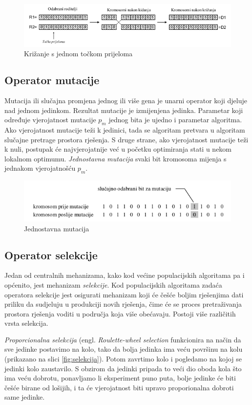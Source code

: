 \documentclass[times, utf8, zavrsni, numeric]{fer}
\begin{document}
\begin{figure}[htb]
\centering
\includegraphics[width=12cm]{img/krizanje.png}
\caption{Križanje s jednom točkom prijeloma}
\label{fig:krizanje}
\end{figure}

\subsection{Operator mutacije}
Mutacija ili slučajna promjena jednog ili više gena je unarni operator koji djeluje nad jednom jedinkom. Rezultat mutacije je izmijenjena jedinka. Parametar koji određuje vjerojatnost mutacije $p_m$ jednog bita je ujedno i parametar algoritma. Ako vjerojatnost mutacije teži k jedinici, tada se algoritam pretvara u algoritam slučajne pretrage prostora rješenja. S druge strane, ako vjerojatnost mutacije teži k nuli, postupak će najvjerojatnije već u početku optimiranja stati u nekom lokalnom optimumu. \emph{Jednostavna mutacija} svaki bit kromosoma mijenja s jednakom vjerojatnošću $p_m$.

\begin{figure}[htb]
\centering
\includegraphics[width=12cm]{img/mutacija.png}
\caption{Jednostavna mutacija}
\label{fig:mutacija}
\end{figure}

\subsection{Operator selekcije}
Jedan od centralnih mehanizama, kako kod većine populacijskih algoritama pa i općenito, jest mehanizam \emph{selekcije}. Kod populacijskih algoritama zadaća operatora selekcije jest osigurati mehanizam koji će češće boljim rješenjima dati priliku da sudjeluju u produkciji novih rješenja, čime će se proces pretraživanja prostora rješenja voditi u područja koja više obećavaju. Postoji više različitih vrsta selekcija.

\emph{Proporcionalna selekcija} (engl. \emph{Roulette-wheel selection} funkcionira na način da sve jedinke postavimo na kolo, tako da bolja jedinka ima veću površinu na kolu (prikazano na slici \ref{fig:selekcija}). Potom zavrtimo kolo i pogledamo na kojoj se jedinki kolo zaustavilo. S obzirom da jedinki pripada to veći dio oboda kola što ima veću dobrotu, ponavljamo li eksperiment puno puta, bolje jedinke će biti češće birane od lošijih, i ta će vjerojatnost biti upravo proporionalna dobroti same jedinke.
\end{document}
